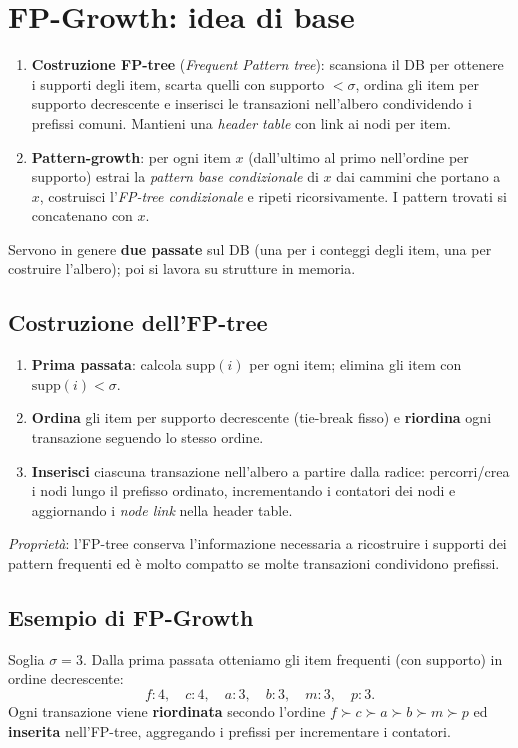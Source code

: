 \section{FP-Growth: idea di base}\label{sec:fpgrowth}
\begin{enumerate}
  \item \textbf{Costruzione FP-tree} (\emph{Frequent Pattern tree}): scansiona il DB per ottenere i supporti degli item, scarta quelli con supporto $<\sigma$, ordina gli item per supporto decrescente e inserisci le transazioni nell’albero condividendo i prefissi comuni. Mantieni una \emph{header table} con link ai nodi per item.
  \item \textbf{Pattern-growth}: per ogni item $x$ (dall’ultimo al primo nell’ordine per supporto) estrai la \emph{pattern base condizionale} di $x$ dai cammini che portano a $x$, costruisci l’\emph{FP-tree condizionale} e ripeti ricorsivamente. I pattern trovati si concatenano con $x$.
\end{enumerate}
Servono in genere \textbf{due passate} sul DB (una per i conteggi degli item, una per costruire l’albero); poi si lavora su strutture in memoria.

\subsection{Costruzione dell'FP-tree}\label{subsec:costruzione-fptree}
\begin{enumerate}
  \item \textbf{Prima passata}: calcola $\mathrm{supp}(i)$ per ogni item; elimina gli item con $\mathrm{supp}(i)<\sigma$.
  \item \textbf{Ordina} gli item per supporto decrescente (tie-break fisso) e \textbf{riordina} ogni transazione seguendo lo stesso ordine.
  \item \textbf{Inserisci} ciascuna transazione nell’albero a partire dalla radice: percorri/crea i nodi lungo il prefisso ordinato, incrementando i contatori dei nodi e aggiornando i \emph{node link} nella header table.
\end{enumerate}
\emph{Propriet\`a}: l’FP-tree conserva l’informazione necessaria a ricostruire i supporti dei pattern frequenti ed \`e molto compatto se molte transazioni condividono prefissi.

\subsection{Esempio di FP-Growth}\label{subsec:fpg-example}
Soglia $\sigma=3$. Dalla prima passata otteniamo gli item frequenti (con supporto) in ordine decrescente:
\[
f:4,\quad c:4,\quad a:3,\quad b:3,\quad m:3,\quad p:3.
\]
Ogni transazione viene \textbf{riordinata} secondo l’ordine $f\!\succ c\!\succ a\!\succ b\!\succ m\!\succ p$ ed \textbf{inserita} nell’FP-tree, aggregando i prefissi per incrementare i contatori.

